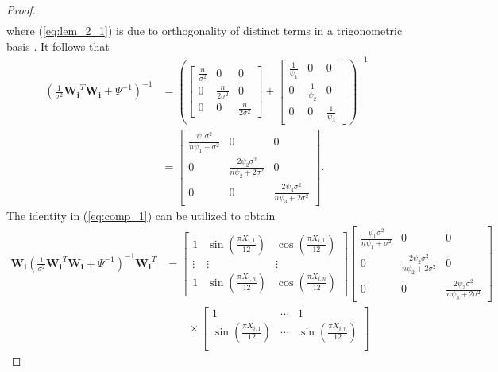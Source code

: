 \begin{proof}
\begin{align}
\end{align}
where (\ref{eq:lem_2_1}) is due to orthogonality of distinct terms in a trigonometric basis \citep[Lemma 1.7]{Tsybakov2009}. It follows that
\begin{align}
    \left(\frac{1}{\sigma^2}\boldsymbol{W_i}^T\boldsymbol{W_i}+\Psi^{-1}\right)^{-1} &= \left( \begin{bmatrix}\frac{n}{\sigma^2} & 0 & 0 \\
    0 & \frac{n}{2\sigma^2} & 0 \\
    0 & 0 & \frac{n}{2\sigma^2}
    \end{bmatrix} + \begin{bmatrix} \frac{1}{\psi_1} & 0 & 0 \\
    0 & \frac{1}{\psi_2} & 0 \\
    0 & 0 & \frac{1}{\psi_3}
    \end{bmatrix}\right)^{-1} \nonumber \\
    &= \begin{bmatrix}\frac{\psi_1\sigma^2}{n\psi_1+\sigma^2} & 0 & 0 \\
    0 & \frac{2\psi_2\sigma^2}{n\psi_2+2\sigma^2} & 0 \\
    0 & 0 &  \frac{2\psi_3\sigma^2}{n\psi_3+2\sigma^2} 
    \end{bmatrix}. \label{eq:comp_1}
\end{align}
The identity in (\ref{eq:comp_1}) can be utilized to obtain
\begin{align*}
\boldsymbol{W_i}\left(\frac{1}{\sigma^2}\boldsymbol{W_i}^T\boldsymbol{W_i}+\Psi^{-1}\right)^{-1}\boldsymbol{W_i}^T 
&= \begin{bmatrix}1 & \sin\left(\frac{\pi X_{i,1}}{12}\right) & \cos\left(\frac{\pi X_{i,1}}{12}\right) \\
    \vdots & \vdots & \vdots \\
    1 & \sin\left(\frac{\pi X_{i,n}}{12}\right) & \cos\left(\frac{\pi X_{i,n}}{12}\right) \end{bmatrix}\begin{bmatrix}\frac{\psi_1\sigma^2}{n\psi_1+\sigma^2} & 0 & 0 \\
    0 & \frac{2\psi_2\sigma^2}{n\psi_2+2\sigma^2} & 0 \\
    0 & 0 &  \frac{2\psi_3\sigma^2}{n\psi_3+2\sigma^2}
    \end{bmatrix} \\
    & \quad \quad \times \begin{bmatrix}
    1 & \cdots & 1 \\ 
    \sin\left(\frac{\pi X_{i,1}}{12}\right) & \cdots & \sin\left(\frac{\pi X_{i,n}}{12}\right) \\ 

\end{bmatrix}
\end{align*}
\end{proof}
